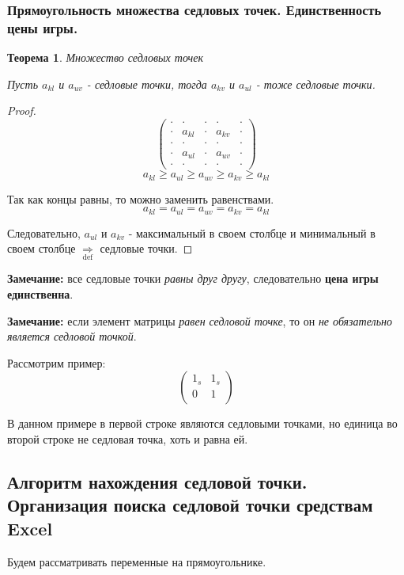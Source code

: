 \documentclass[aps,%
12pt,%
final,%
oneside,
onecolumn,%
musixtex, %
superscriptaddress,%
centertags]{article} %
\theoremstyle{plain}
\newtheorem{theorem}{Теорема}[section] %
\theoremstyle{definition}
\theoremstyle{remark}
\begin{document}
\subsubsection{Прямоугольность множества седловых точек. Единственность цены игры.}

\begin{theorem}
  Множество седловых точек

  Пусть $a_{kl}$ и $a_{uv}$ - седловые точки, тогда $a_{kv}$ и $a_{ul}$ - тоже седловые точки. 
\end{theorem}

\begin{proof}
  $$\begin{pmatrix}
  \cdot  &  \cdot &   \cdot &   \cdot  &  \cdot \\ 
  \cdot &a_{kl} &  \cdot  & a_{kv}  &  \cdot \\ 
  \cdot  &  \cdot  &  \cdot &   \cdot &   \cdot \\ 
  \cdot & a_{ul}  &   \cdot & a_{uv} & \cdot \\ 
  \cdot &  \cdot  &   \cdot  &    \cdot    &   \cdot 
  \end{pmatrix}$$
  $$ a_{kl} \geq a_{ul} \geq a_{uv} \geq a_{kv} \geq a_{kl} $$

  Так как концы равны, то можно заменить равенствами. 
  $$ a_{kl} =a_{ul} = a_{uv} = a_{kv} = a_{kl} $$

  Следовательно, $a_{ul}$ и $a_{kv}$ - максимальный в своем столбце и минимальный в своем столбце $\underset{\text{def}}{\Rightarrow}$ седловые точки.
\end{proof}

\textbf{Замечание:} все седловые точки \textit{равны друг другу}, следовательно \textbf{цена игры единственна}.

\textbf{Замечание:} если элемент матрицы \textit{равен седловой точке}, то он \textit{не обязательно является седловой точкой}.

Рассмотрим пример:
$$
\begin{pmatrix}
1_{s} & 1_{s} \\
0 & 1 \\
\end{pmatrix}
$$

В данном примере в первой строке являются седловыми точками, но единица во второй строке не седловая точка, хоть и равна ей.

\newpage
\subsection{Алгоритм нахождения седловой точки. Организация поиска седловой точки средствам Excel}
Будем рассматривать переменные на прямоугольнике.
\end{document}
